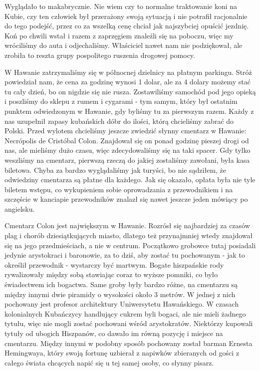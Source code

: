 \noindent Wyglądało to makabrycznie.
Nie wiem czy to normalne traktowanie koni na Kubie, czy ten człowiek był przerażony swoją sytuacją i nie potrafił racjonalnie do tego podejść, przez co za wszelką cenę chciał jak najszybciej opuścić jezdnię.
Koń po chwili wstał i razem z zaprzęgiem znaleźli się na poboczu, więc my wróciliśmy do auta i odjechaliśmy.
Właściciel nawet nam nie podziękował, ale zrobiła to reszta grupy pospolitego ruszenia drogowej pomocy.
\par W Hawanie zatrzymaliśmy się w północnej dzielnicy na płatnym parkingu.
Stróż powiedział nam, że cena za godzinę wynosi 1 dolar, ale za 4 dolary możemy stać tu cały dzień, bo on nigdzie się nie rusza.
Zostawiliśmy samochód pod jego opieką i poszliśmy do sklepu z rumem i cygarami - 
tym samym, który był ostatnim punktem odwiedzonym w Hawanie, gdy byliśmy tu za pierwszym razem.
Każdy z nas uzupełnił zapasy kubańskich dóbr do ilości, którą chcieliśmy zabrać do Polski.
Przed wylotem chcieliśmy jeszcze zwiedzić słynny cmentarz w Hawanie: Necrópolis de Cristóbal Colon.
Znajdował się on ponad godzinę pieszej drogi od nas, ale mieliśmy dużo czasu, więc zdecydowaliśmy się na taki spacer.
Gdy tylko weszliśmy na cmentarz, pierwszą rzeczą do jakiej zostaliśmy zawołani, była kasa biletowa.
Chyba za bardzo wyglądaliśmy jak turyści, bo nie sądziłem, że odwiedziny cmentarza są płatne dla każdego.
Jak się okazało, opłata była nie tyle biletem wstępu, co wykupieniem sobie oprowadzania z przewodnikiem i na szczęście w kanciapie przewodników znalazł się nawet jeszcze jeden mówiący po angielsku.
\par Cmentarz Colon jest największym w Hawanie.
Rozrósł się najbardziej za czasów plag i chorób dziesiątkujących miasto, dlatego też przynajmniej wtedy znajdował się na jego przedmieściach, a nie w centrum.
Początkowo grobowce tutaj posiadali jedynie arystokraci i baronowie, za to dziś, aby zostać tu pochowanym - jak to określił przewodnik - wystarczy być martwym.
Bogate hiszpańskie rody rywalizowały między sobą stawiając coraz to wyższe pomniki, co było świadectwem ich bogactwa.
Same groby były bardzo różne, na cmentarzu są między innymi dwie piramidy o wysokości około 3 metrów.
W jednej z nich pochowany jest profesor architektury Uniwersytetu Hawańskiego.
W czasach kolonialnych Kubańczycy handlujący cukrem byli bogaci, ale nie mieli żadnego tytułu, więc nie mogli zostać pochowani wśród arystokratów.
Niektórzy kupowali tytuły od ubogich Hiszpanów, co dawało im równą pozycję i miejsce na cmentarzu.
Między innymi w podobny sposób pochowany został barman Ernesta Hemingwaya, który swoją fortunę uzbierał z napiwków zbieranych od gości z całego świata chcących napić się u tej samej osoby, co słynny pisarz.
